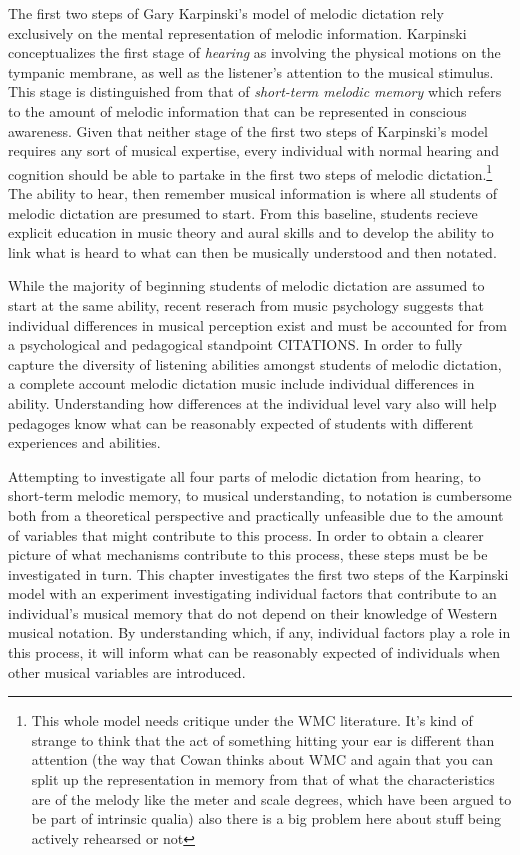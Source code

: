 \documentclass[]{book}
\let\rmarkdownfootnote\footnote%
\def\footnote{\protect\rmarkdownfootnote}
\begin{document}
The first two steps of Gary Karpinski's model of melodic dictation \citep{karpinskiAuralSkillsAcquisition2000, karpinskiModelMusicPerception1990} rely exclusively on the mental representation of melodic information.
Karpinski conceptualizes the first stage of \emph{hearing} as involving the physical motions on the tympanic membrane, as well as the listener's attention to the musical stimulus.
This stage is distinguished from that of \emph{short-term melodic memory} which refers to the amount of melodic information that can be represented in conscious awareness.
Given that neither stage of the first two steps of Karpinski's model requires any sort of musical expertise, every individual with normal hearing and cognition should be able to partake in the first two steps of melodic dictation.\footnote{This whole model needs critique under the WMC literature. It's kind of strange to think that the act of something hitting your ear is different than attention (the way that Cowan thinks about WMC and again that you can split up the representation in memory from that of what the characteristics are of the melody like the meter and scale degrees, which have been argued to be part of intrinsic qualia) also there is a big problem here about stuff being actively rehearsed or not}
The ability to hear, then remember musical information is where all students of melodic dictation are presumed to start.
From this baseline, students recieve explicit education in music theory and aural skills and to develop the ability to link what is heard to what can then be musically understood and then notated.

While the majority of beginning students of melodic dictation are assumed to start at the same ability, recent reserach from music psychology suggests that individual differences in musical perception exist and must be accounted for from a psychological and pedagogical standpoint CITATIONS.
In order to fully capture the diversity of listening abilities amongst students of melodic dictation, a complete account melodic dictation music include individual differences in ability.
Understanding how differences at the individual level vary also will help pedagoges know what can be reasonably expected of students with different experiences and abilities.

Attempting to investigate all four parts of melodic dictation from hearing, to short-term melodic memory, to musical understanding, to notation is cumbersome both from a theoretical perspective and practically unfeasible due to the amount of variables that might contribute to this process.
In order to obtain a clearer picture of what mechanisms contribute to this process, these steps must be be investigated in turn.
This chapter investigates the first two steps of the Karpinski model with an experiment investigating individual factors that contribute to an individual's musical memory that do not depend on their knowledge of Western musical notation.
By understanding which, if any, individual factors play a role in this process, it will inform what can be reasonably expected of individuals when other musical variables are introduced.
\end{document}
